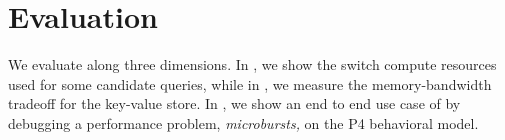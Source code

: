 \section{Evaluation}
\label{sec:eval}



We evaluate \TheSystem along three dimensions. In , we show
the switch compute resources used for some candidate \TheSystem queries, while
in , we measure the memory-bandwidth tradeoff for the
key-value store. In , we show an end to end use case of
\TheSystem by debugging a performance problem, {\em microbursts,} on the P4
behavioral model.








